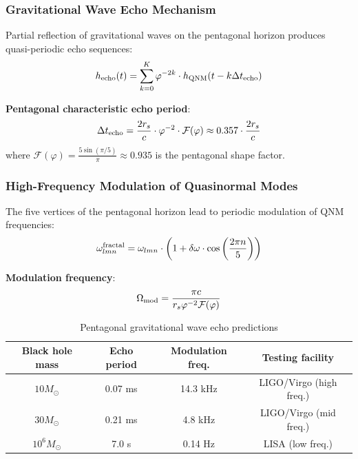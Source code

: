 \documentclass[12pt,a4paper,twocolumn]{article}
\renewcommand{\phi}{\varphi}
\begin{document}
\subsubsection{Gravitational Wave Echo Mechanism}

Partial reflection of gravitational waves on the pentagonal horizon produces quasi-periodic echo sequences:
\begin{equation}
h_{\rm echo}(t) = \sum_{k=0}^{K} \phi^{-2k} \cdot h_{\rm QNM}(t - k\Delta t_{\rm echo})
\end{equation}

\textbf{Pentagonal characteristic echo period}:
\begin{equation}
\Delta t_{\rm echo} = \frac{2r_s}{c} \cdot \phi^{-2} \cdot \mathcal{F}(\phi) \approx 0.357 \cdot \frac{2r_s}{c}
\end{equation}
where $\mathcal{F}(\phi) = \frac{5\sin(\pi/5)}{\pi} \approx 0.935$ is the pentagonal shape factor.

\subsubsection{High-Frequency Modulation of Quasinormal Modes}

The five vertices of the pentagonal horizon lead to periodic modulation of QNM frequencies:
\begin{equation}
\omega_{lmn}^{\rm fractal} = \omega_{lmn} \cdot \left(1 + \delta\omega \cdot \cos\left(\frac{2\pi n}{5}\right)\right)
\end{equation}

\textbf{Modulation frequency}:
\begin{equation}
\Omega_{\rm mod} = \frac{\pi c}{r_s \phi^{-2}\mathcal{F}(\phi)}
\end{equation}

\begin{table}[H]
\centering
\footnotesize
\caption{Pentagonal gravitational wave echo predictions}
\begin{tabular}{c|c|c|c}
\hline
\textbf{Black hole mass} & \textbf{Echo period} & \textbf{Modulation freq.} & \textbf{Testing facility} \\
\hline
$10 M_\odot$ & 0.07 ms & 14.3 kHz & LIGO/Virgo (high freq.) \\
$30 M_\odot$ & 0.21 ms & 4.8 kHz & LIGO/Virgo (mid freq.) \\
$10^6 M_\odot$ & 7.0 s & 0.14 Hz & LISA (low freq.) \\
\hline
\end{tabular}
\end{table}
\end{document}
